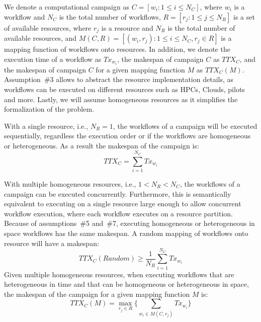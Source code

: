 We denote a computational campaign as $C = [w_{i}: 1 \leq i \leq N_{C}]$, where $w_{i}$ is a workflow and $N_{C}$ is the total number of workflows, $R = [ r_{j}: 1 \leq j \leq N_{R}]$ is a set of available resources, where $r_{j}$ is a resource and $N_{R}$ is the total number of available resources, and $ M(C,R) = [(w_i, r_j): 1 \leq i \leq N_{C}, r_j \in R] $ is a mapping function of workflows onto resources.
In addition, we denote the execution time of a workflow as $Tx_{w_{i}}$, the makespan of campaign $C$ as $TTX_{C}$, and the makespan of campaign $C$ for a given mapping function $ M $ as $TTX_{C}(M)$.
Assumption~\#3 allows to abstract the resource implementation details, as workflows can be executed on different resources such as HPCs, Clouds, pilots and more. 
Lastly, we will assume homogeneous resources as it simplifies the formalization of the problem.

With a single resource, i.e., $N_{R} = 1$, the workflows of a campaign will be executed sequentially, regardless the execution order or if the workflows are homogeneous or heterogeneous.
As a result the makespan of the campaign is:
\begin{equation}
   TTX_{C} = \sum_{i=1}^{N_{C}}Tx_{w_{i}} 
\end{equation}

With multiple homogeneous resources, i.e., $1 < N_{R} < N_{C}$, the workflows of a campaign can be executed concurrently.
Furthermore, this is semantically equivalent to executing on a single resource large enough to allow concurrent workflow execution, where each workflow executes on a resource partition. 
Because of assumptions~\#5 and~\#7, executing homogeneous or heterogeneous in space workflows has the same makespan.
A random mapping of workflows onto resource will have a makespan:
\begin{equation}
   TTX_{C}(Random) \geq \frac{1}{N_{R}}\sum_{i=1}^{N_{C}} Tx_{w_{i}} 
\end{equation}
Given multiple homogeneous resources, when executing workflows that are heterogeneous in time and that can be homogeneous or heterogeneous in space, the makespan of the campaign for a given mapping function $ M $ is:
\begin{equation}
TTX_{C}(M) = \max_{r_{j}\in R}\Big\{\sum_{w_{i}\in M(C,r_{j})}Tx_{w_{i}}\Big\}
\label{eq:makespan}
\end{equation}


